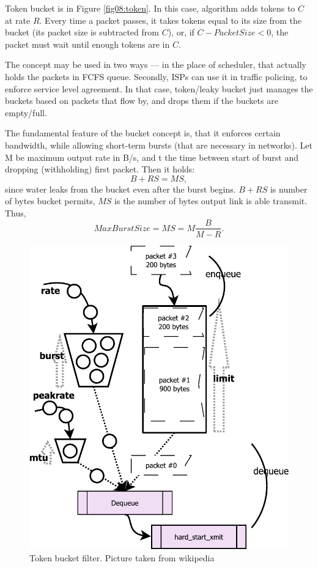 Token bucket is in Figure \ref{fig08:token}. In this case, algorithm adds tokens to $C$ at rate $R$. Every time a packet passes, it takes tokens equal to its size from the bucket (its packet size is subtracted from $C$), or, if $C - PacketSize < 0$, the packet must wait until enough tokens are in $C$. 

The concept may be used in two ways --- in the place of scheduler, that actually holds the packets in FCFS queue. Secondly, ISPs can use it in traffic policing, to enforce service level agreement. In that case, token/leaky bucket just manages the buckets based on packets that flow by, and drops them if the buckets are empty/full.

The fundamental feature of the bucket concept is, that it enforces certain bandwidth, while allowing short-term bursts (that are necessary in networks). Let M be maximum output rate in B/s, and t the time between start of burst and dropping (withholding) first packet. Then it holds:
\[
	B + RS = MS,
\]
since water leaks from the bucket even after the burst begins. $B + RS$ is number of bytes bucket permits, $MS$ is the number of bytes output link is able transmit. Thus,
\[
	MaxBurstSize = MS = M\frac{B}{M - R}.
\]

\begin{figure}
	\centering
	\includegraphics[width=137mm]{drawings/tbf}
	\caption{Token bucket filter. Picture taken from wikipedia \cite{TBF:picture}}
	
	\label{fig09:tbf}
\end{figure}

